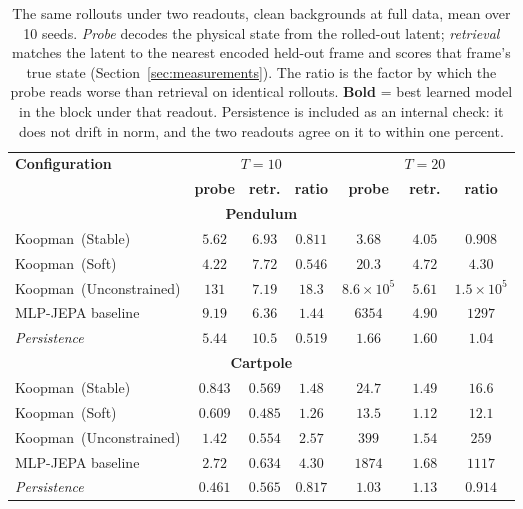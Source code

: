 \begin{table}[t]
\caption{The same rollouts under two readouts, clean backgrounds at full data, mean over 10 seeds. \emph{Probe} decodes the physical state from the rolled-out latent; \emph{retrieval} matches the latent to the nearest encoded held-out frame and scores that frame's true state (Section~\ref{sec:measurements}). The ratio is the factor by which the probe reads worse than retrieval on identical rollouts. \textbf{Bold} = best learned model in the block under that readout. Persistence is included as an internal check: it does not drift in norm, and the two readouts agree on it to within one percent.}
\label{tab:retrieval}
\centering
\small
\begin{tabular}{@{}lcccccc@{}}
\toprule
\textbf{Configuration} & \multicolumn{3}{c}{$T{=}10$} & \multicolumn{3}{c}{$T{=}20$} \\
 & \textbf{probe} & \textbf{retr.} & \textbf{ratio} & \textbf{probe} & \textbf{retr.} & \textbf{ratio} \\
\midrule
\multicolumn{7}{c}{\textbf{Pendulum}} \\
\midrule
Koopman~(Stable)         & $5.62$ & $6.93$ & $0.811$ & $\mathbf{3.68}$ & $\mathbf{4.05}$ & $0.908$ \\
Koopman~(Soft)           & $\mathbf{4.22}$ & $7.72$ & $0.546$ & $20.3$ & $4.72$ & $4.30$ \\
Koopman~(Unconstrained)  & $131$ & $7.19$ & $18.3$ & $8.6{\times}10^{5}$ & $5.61$ & $1.5{\times}10^{5}$ \\
MLP-JEPA baseline        & $9.19$ & $\mathbf{6.36}$ & $1.44$ & $6354$ & $4.90$ & $1297$ \\
\midrule
\emph{Persistence}             & $5.44$ & $10.5$ & $0.519$ & $1.66$ & $1.60$ & $1.04$ \\
\midrule
\multicolumn{7}{c}{\textbf{Cartpole}} \\
\midrule
Koopman~(Stable)         & $0.843$ & $0.569$ & $1.48$ & $24.7$ & $1.49$ & $16.6$ \\
Koopman~(Soft)           & $\mathbf{0.609}$ & $\mathbf{0.485}$ & $1.26$ & $\mathbf{13.5}$ & $\mathbf{1.12}$ & $12.1$ \\
Koopman~(Unconstrained)  & $1.42$ & $0.554$ & $2.57$ & $399$ & $1.54$ & $259$ \\
MLP-JEPA baseline        & $2.72$ & $0.634$ & $4.30$ & $1874$ & $1.68$ & $1117$ \\
\midrule
\emph{Persistence}             & $0.461$ & $0.565$ & $0.817$ & $1.03$ & $1.13$ & $0.914$ \\
\bottomrule
\end{tabular}
\end{table}
